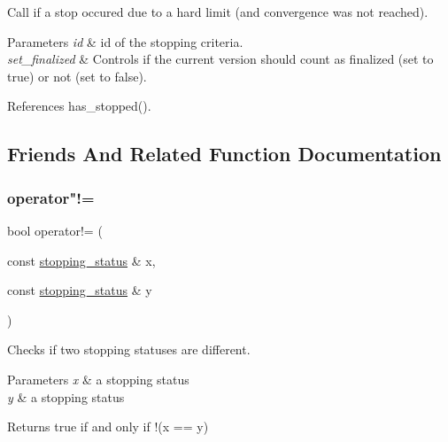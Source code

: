Call if a stop occured due to a hard limit (and convergence was not reached). 


\begin{DoxyParams}{Parameters}
{\em id} & id of the stopping criteria. \\
\hline
{\em set\+\_\+finalized} & Controls if the current version should count as finalized (set to true) or not (set to false). \\
\hline
\end{DoxyParams}


References has\+\_\+stopped().



\subsection{Friends And Related Function Documentation}
\mbox{\label{classgko_1_1stopping__status_a61e994f69678aab2be54a342d4725e6c}} 
\subsubsection{\texorpdfstring{operator"!=}{operator!=}}
{\footnotesize\ttfamily bool operator!= (\begin{DoxyParamCaption}\item[{const \hyperlink{classgko_1_1stopping__status}{stopping\+\_\+status} \&}]{x,  }\item[{const \hyperlink{classgko_1_1stopping__status}{stopping\+\_\+status} \&}]{y }\end{DoxyParamCaption})\hspace{0.3cm}{\ttfamily [friend]}}



Checks if two stopping statuses are different. 


\begin{DoxyParams}{Parameters}
{\em x} & a stopping status \\
\hline
{\em y} & a stopping status\\
\hline
\end{DoxyParams}
\begin{DoxyReturn}{Returns}
true if and only if {\ttfamily !(x == y)} 
\end{DoxyReturn}
\mbox{\label{classgko_1_1stopping__status_a7d7a8893aec4d1d561b4f684ca5d090e}} 
